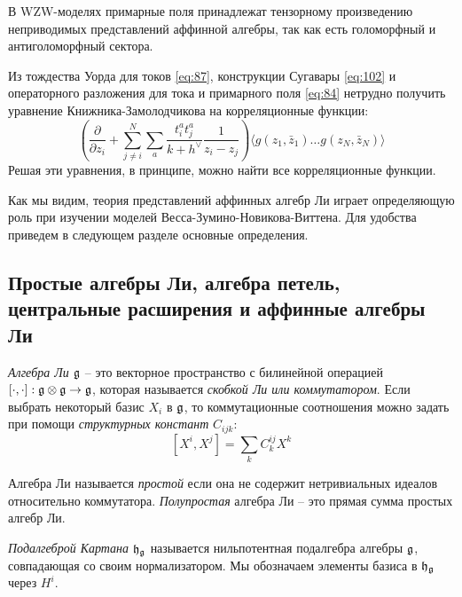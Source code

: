 В WZW-моделях примарные поля
принадлежат тензорному произведению неприводимых представлений аффинной алгебры, так как есть
голоморфный и антиголоморфный сектора.

Из тождества Уорда для токов \eqref{eq:87}, конструкции Сугавары \eqref{eq:102} и операторного разложения для тока и примарного поля \eqref{eq:84} нетрудно получить уравнение Книжника-Замолодчикова на корреляционные функции:
\begin{equation}
  \label{eq:66}
  \left( \frac{\partial}{\partial z_i}+\sum_{j\neq i}^N \sum_a \frac{t^a_i t^a_j}{k+h^{\vee}}\frac{1}{z_i-z_j}\right) \langle g (z_1,\bar z_1)\dots g(z_N,\bar z_N)\rangle
\end{equation}
Решая эти уравнения, в принципе, можно найти все корреляционные функции. 

Как мы видим, теория представлений аффинных алгебр Ли играет определяющую роль при изучении моделей Весса-Зумино-Новикова-Виттена. Для удобства приведем в следующем разделе основные определения.

\subsection{Простые алгебры Ли, алгебра петель, центральные расширения и аффинные алгебры Ли}

\label{sec:intro-simple-lie-algebras}
\begin{definition}
{\it Алгебра Ли $\mathfrak{g}$} -- это векторное пространство с билинейной операцией $[\cdot,\cdot]:\mathfrak{g}\otimes\mathfrak{g}\to \mathfrak{g}$, которая называется  {\it скобкой Ли или коммутатором}. Если выбрать некоторый базис  $X_{i}$ в $\mathfrak{g}$, то коммутационные соотношения можно задать при помощи  {\it структурных констант} $C_{ijk}$:
\begin{equation}
  \label{eq:1}
  [X^{i},X^{j}]=\sum_{k} C^{ij}_{k} X^{k}
\end{equation}
  
\end{definition}

Алгебра Ли называется {\it простой} если она не содержит нетривиальных идеалов относительно коммутатора. {\it Полупростая} алгебра Ли -- это прямая сумма простых алгебр Ли. 

{\it Подалгеброй Картана}  $\mathfrak{h}_{\mathfrak{g}}$ называется нильпотентная подалгебра алгебры $\mathfrak{g}$, совпадающая со своим нормализатором. Мы обозначаем элементы базиса в $\mathfrak{h}_{\mathfrak{g}}$ через $H^{i}$.

